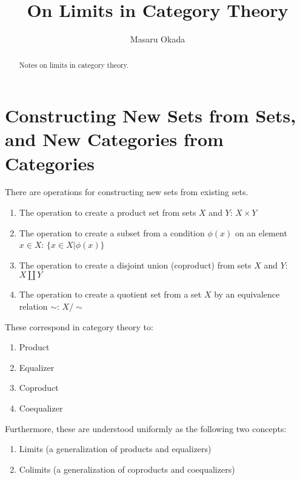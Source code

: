 \documentclass[uplatex,a4j,12pt,dvipdfmx]{jsarticle}
\title{
On Limits in Category Theory
}
\author{
Masaru Okada
}
\begin{document}
\maketitle


\begin{abstract}
	Notes on limits in category theory.
\end{abstract}

\section{Constructing New Sets from Sets, and New Categories from Categories}

There are operations for constructing new sets from existing sets.

\begin{enumerate}
	\item The operation to create a product set from sets $X$ and $Y$: $X \times Y$
	\item The operation to create a subset from a condition $\phi(x)$ on an element $x \in X$: $\{ x \in X | \phi(x) \}$
	\item The operation to create a disjoint union (coproduct) from sets $X$ and $Y$: $X \coprod Y$
	\item The operation to create a quotient set from a set $X$ by an equivalence relation $\sim$: $X / \sim$
\end{enumerate}

These correspond in category theory to:

\begin{enumerate}
	\item Product
	\item Equalizer
	\item Coproduct
	\item Coequalizer
\end{enumerate}

Furthermore, these are understood uniformly as the following two concepts:

\begin{enumerate}
	\item Limits (a generalization of products and equalizers)
	\item Colimits (a generalization of coproducts and coequalizers)
\end{enumerate}
\end{document}
